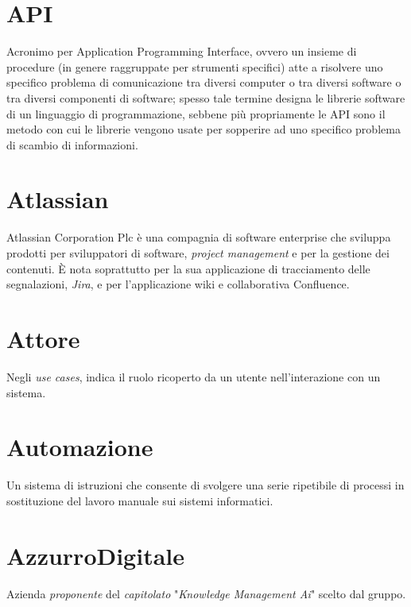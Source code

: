 \section{API}
Acronimo per Application Programming Interface, ovvero un insieme di procedure (in genere raggruppate per strumenti specifici) atte a risolvere uno specifico problema di comunicazione tra diversi computer o tra diversi software o tra diversi componenti di software; spesso tale termine designa le librerie software di un linguaggio di programmazione, sebbene più propriamente le API sono il metodo con cui le librerie vengono usate per sopperire ad uno specifico problema di scambio di informazioni.

\section{Atlassian}
Atlassian Corporation Plc è una compagnia di software enterprise che sviluppa prodotti per sviluppatori di software, \emph{project management} e per la gestione dei contenuti. È nota soprattutto per la sua applicazione di tracciamento delle segnalazioni, \emph{Jira}, e per l'applicazione wiki e collaborativa Confluence.

\section{Attore}
Negli \emph{use cases}, indica il ruolo ricoperto da un utente nell'interazione con un sistema.

\section{Automazione}
Un sistema di istruzioni che consente di svolgere una serie ripetibile di processi in sostituzione del lavoro manuale sui sistemi informatici.

\section{AzzurroDigitale}
Azienda \emph{proponente} del \emph{capitolato} "\emph{Knowledge Management Ai}" scelto dal gruppo.
